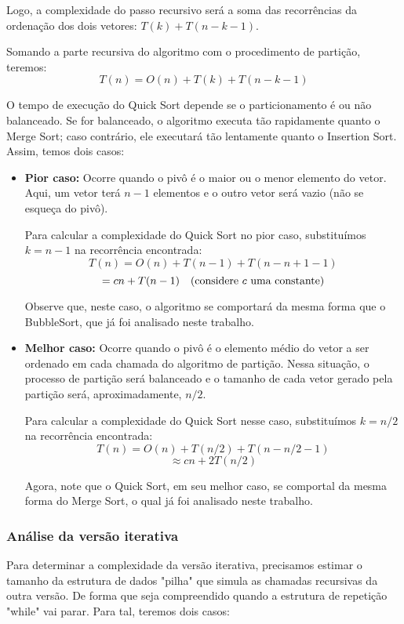 Logo, a complexidade do passo recursivo será a soma das recorrências da ordenação dos dois vetores: \( T(k) + T(n - k - 1) \).

Somando a parte recursiva do algoritmo com o procedimento de partição, teremos:
\[
	T(n) = O(n) + T(k) + T(n - k - 1)
\]

O tempo de execução do Quick Sort depende se o particionamento é ou não balanceado. Se for balanceado, o algoritmo executa tão rapidamente quanto o Merge Sort; caso contrário, ele executará tão lentamente quanto o Insertion Sort. Assim, temos dois casos:

\begin{itemize}
	\item \textbf{Pior caso:} Ocorre quando o pivô é o maior ou o menor elemento do vetor. Aqui, um vetor terá \( n-1 \) elementos e o outro vetor será vazio (não se esqueça do pivô).

	      Para calcular a complexidade do Quick Sort no pior caso, substituímos \( k = n - 1 \) na recorrência encontrada:
	      \[
		      T(n) = O(n) + T(n-1) + T(n - n + 1 - 1)
	      \]
	      \[
		      = cn + T(n-1) \quad \text{(considere \( c \) uma constante)}
	      \]

	      Observe que, neste caso, o algoritmo se comportará da mesma forma que o BubbleSort, que já foi analisado neste trabalho.

	\item \textbf{Melhor caso:} Ocorre quando o pivô é o elemento médio do vetor a ser ordenado em cada chamada do algoritmo de partição. Nessa situação, o processo de partição será balanceado e o tamanho de cada vetor gerado pela partição será, aproximadamente, \( n/2 \).

	      Para calcular a complexidade do Quick Sort nesse caso, substituímos \( k = n/2 \) na recorrência encontrada:
	      \[
		      T(n) = O(n) + T(n/2) + T(n - n/2 - 1)
	      \]
	      \[
		      \approx cn + 2T(n/2)
	      \]

	      Agora, note que o Quick Sort, em seu melhor caso, se comportal da mesma forma do Merge Sort, o qual já foi analisado neste trabalho.

\end{itemize}

\subsubsection{Análise da versão iterativa}

Para determinar a complexidade da versão iterativa, precisamos estimar o tamanho da estrutura de dados "pilha" que simula as chamadas recursivas da outra versão. De forma que seja compreendido quando a estrutura de repetição "while" vai parar. Para tal, teremos dois casos:

